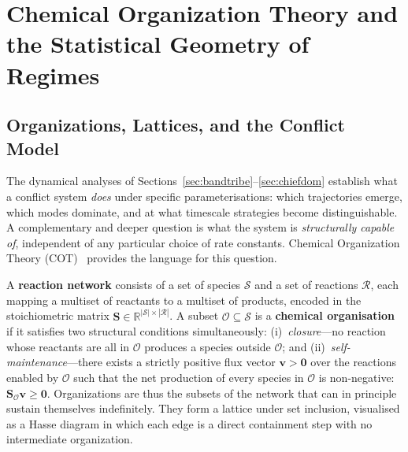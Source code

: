 
\section{Chemical Organization Theory and the Statistical Geometry of Regimes}
\label{sec:cot_lp}

\subsection{Organizations, Lattices, and the Conflict Model}
\label{sec:cot_orgs}

The dynamical analyses of Sections~\ref{sec:bandtribe}--\ref{sec:chiefdom}
establish what a conflict system \emph{does} under specific parameterisations:
which trajectories emerge, which modes dominate, and at what timescale
strategies become distinguishable.  A complementary and deeper question is
what the system is \emph{structurally capable of}, independent of any
particular choice of rate constants.  Chemical Organization Theory
(COT)~\cite{dittrich2007chemical,veloz2014reaction} provides the language
for this question.

A \textbf{reaction network} consists of a set of species $\mathcal{S}$ and a
set of reactions $\mathcal{R}$, each mapping a multiset of reactants to a
multiset of products, encoded in the stoichiometric matrix
$\mathbf{S} \in \mathbb{R}^{|\mathcal{S}| \times |\mathcal{R}|}$.
A subset $\mathcal{O} \subseteq \mathcal{S}$ is a \textbf{chemical
organisation} if it satisfies two structural conditions simultaneously:
(i)~\emph{closure}---no reaction whose reactants are all in $\mathcal{O}$
produces a species outside $\mathcal{O}$; and
(ii)~\emph{self-maintenance}---there exists a strictly positive flux vector
$\mathbf{v} > \mathbf{0}$ over the reactions enabled by $\mathcal{O}$ such
that the net production of every species in $\mathcal{O}$ is non-negative:
$\mathbf{S}_{\mathcal{O}} \mathbf{v} \geq \mathbf{0}$.
Organizations are thus the subsets of the network that can in principle
sustain themselves indefinitely.  They form a lattice under set inclusion,
visualised as a Hasse diagram in which each edge is a direct containment
step with no intermediate organization.

